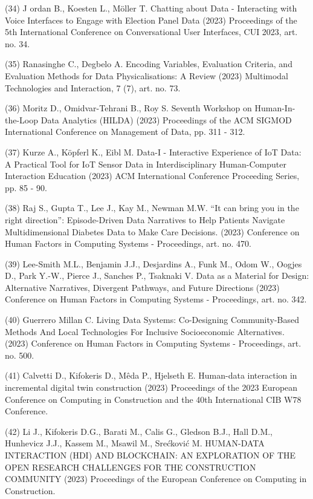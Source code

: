 \documentclass[
	12pt,				%
	oneside,			%
	a4paper,			%
	english,			%
	brazil				%
	]{abntex2ppgsi}
\begin{document}
\begin{apendicesenv}
(34) J ordan B., Koesten L., Möller T. Chatting about Data - Interacting with Voice Interfaces to Engage with Election Panel Data (2023) Proceedings of the 5th International Conference on Conversational User Interfaces, CUI 2023, art. no. 34.

(35) Ranasinghe C., Degbelo A. Encoding Variables, Evaluation Criteria, and Evaluation Methods for Data Physicalisations: A Review (2023) Multimodal Technologies and Interaction, 7 (7), art. no. 73.

(36) Moritz D., Omidvar-Tehrani B., Roy S. Seventh Workshop on Human-In-the-Loop Data Analytics (HILDA) (2023) Proceedings of the ACM SIGMOD International Conference on Management of Data, pp. 311 - 312.

(37) Kurze A., Köpferl K., Eibl M. Data-I - Interactive Experience of IoT Data: A Practical Tool for IoT Sensor Data in Interdisciplinary Human-Computer Interaction Education (2023) ACM International Conference Proceeding Series, pp. 85 - 90.

(38) Raj S., Gupta T., Lee J., Kay M., Newman M.W. ``It can bring you in the right direction'': Episode-Driven Data Narratives to Help Patients Navigate Multidimensional Diabetes Data to Make Care Decisions. (2023) Conference on Human Factors in Computing Systems - Proceedings, art. no. 470.

(39) Lee-Smith M.L., Benjamin J.J., Desjardins A., Funk M., Odom W., Oogjes D., Park Y.-W., Pierce J., Sanches P., Tsaknaki V. Data as a Material for Design: Alternative Narratives, Divergent Pathways, and Future Directions (2023) Conference on Human Factors in Computing Systems - Proceedings, art. no. 342.

(40) Guerrero Millan C. Living Data Systems: Co-Designing Community-Based Methods And Local Technologies For Inclusive Socioeconomic Alternatives. (2023) Conference on Human Factors in Computing Systems - Proceedings, art. no. 500.

(41) Calvetti D., Kifokeris D., Mêda P., Hjelseth E. Human-data interaction in incremental digital twin construction (2023) Proceedings of the 2023 European Conference on Computing in Construction and the 40th International CIB W78 Conference.

(42) Li J., Kifokeris D.G., Barati M., Calis G., Gledson B.J., Hall D.M., Hunhevicz J.J., Kassem M., Msawil M., Srećković M. HUMAN-DATA INTERACTION (HDI) AND BLOCKCHAIN: AN EXPLORATION OF THE OPEN RESEARCH CHALLENGES FOR THE CONSTRUCTION COMMUNITY (2023) Proceedings of the European Conference on Computing in Construction.


\end{apendicesenv}
\end{document}
